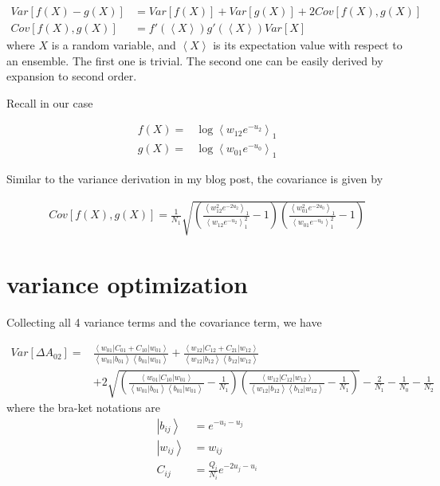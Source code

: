 \documentclass[notitlepage, amsmath, amssymb, aps]{revtex4-1}
\begin{document}
\begin{align}
Var[f(X)-g(X)] &= Var[f(X)] + Var[g(X)] + 2Cov[f(X), g(X)] \\
Cov[f(X), g(X)] &= f'(\left<X\right>)g'(\left<X\right>) Var[X]
\end{align}
where $X$ is a random variable, and $\left<X\right>$ is its expectation value with respect to an ensemble.
The first one is trivial. The second one can be easily derived by expansion to second order.

Recall in our case

\begin{align}
f(X) =& \log\left<w_{12} e^{-u_2}\right>_1 \\
g(X) =& \log\left<w_{01}e^{-u_0}\right>_1
\end{align}

Similar to the variance derivation in my blog post, the covariance is given by

\begin{align}
Cov[f(X), g(X)] = \frac{1}{N_1}\sqrt{\left(\frac{\left<w_{12}^2 e^{-2u_2}\right>_1 }{\left<w_{12} e^{-u_2}\right>_1^2 } - 1\right)\left(\frac{\left<w_{01}^2e^{-2u_0}\right>_1}{\left<w_{01}e^{-u_0}\right>_1^2} - 1\right)}
\end{align}


\section{variance optimization}

Collecting all 4 variance terms and the covariance term, we have

\begin{align*}
Var[\Delta A_{02}] =& \frac{\left<w_{01}|C_{01}+C_{10}|w_{01}\right>}{\left<w_{01}|b_{01}\right>\left<b_{01}|w_{01}\right>}
            + \frac{\left< w_{12}|C_{12} + C_{21} |w_{12} \right>}{\left<w_{12}|b_{12} \right>\left<b_{12}|w_{12} \right>} \\
            &+ 2\sqrt{\left(\frac{\left<w_{01}|C_{10}|w_{01}\right>}{\left<w_{01}|b_{01}\right>\left<b_{01}|w_{01}\right>} -\frac{1}{N_1}\right)
                     \left(\frac{\left< w_{12}|C_{12} |w_{12} \right>}{\left<w_{12}|b_{12} \right>\left<b_{12}|w_{12} \right>} -\frac{1}{N_1}\right)}
            - \frac{2}{N_1} - \frac{1}{N_0} - \frac{1}{N_2}
\end{align*}
where the bra-ket notations are
\begin{align}
\left|b_{ij} \right> &= e^{-u_i - u_j} \\
\left|w_{ij} \right> &= w_{ij} \\
C_{ij} &= \frac{Q_i}{N_i} e^{-2u_j - u_i}
\end{align}
\end{document}
